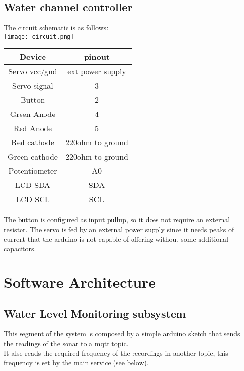 \subsection{Water channel controller}
The circuit schematic is as follows:\\
\texttt{[image: circuit.png]}
\begin{center}
    \begin{tabular}{|c|c|}
        \hline
        Device             & pinout \\
        \hline
        \hline
        Servo vcc/gnd  & ext power supply     \\
        \hline
        Servo signal                &    3   \\
        \hline
        Button                 & 2      \\
        \hline
        Green Anode                 & 4      \\
        \hline
        Red Anode                 & 5      \\
        \hline
        Red cathode              & 220ohm to ground      \\
        \hline
        Green cathode              & 220ohm to ground     \\
        \hline
        Potentiometer              & A0     \\
        \hline
        LCD  SDA             & SDA     \\
        \hline
        LCD  SCL             & SCL     \\
        \hline
    \end{tabular}
\end{center}
The button is configured as input pullup, so it does not require an external resistor.
The servo is fed by an external power supply since it needs peaks of current that the arduino is not capable of offering without some additional capacitors. 
\pagebreak


\section{Software Architecture}
\subsection{Water Level Monitoring subsystem}
This segment of the system is composed by a simple arduino sketch that sends the readings of the sonar to a mqtt topic.\\
It also reads the required frequency of the recordings in another topic, this frequency is set by the main service (see below).
